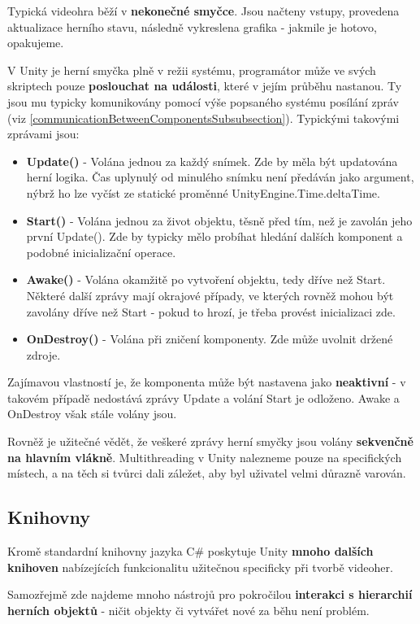 Typická videohra běží v \textbf{nekonečné smyčce}. Jsou načteny vstupy, provedena aktualizace herního stavu, následně vykreslena grafika - jakmile je hotovo, opakujeme. 

V Unity je herní smyčka plně v režii systému, programátor může ve svých skriptech pouze \textbf{poslouchat na události}, které v jejím průběhu nastanou. Ty jsou mu typicky komunikovány pomocí výše popsaného systému posílání zpráv (viz \ref{communicationBetweenComponentsSubsubsection}).
Typickými takovými zprávami jsou:

\begin{itemize}
    \item \textbf{Update()} - Volána jednou za každý snímek. Zde by měla být updatována herní logika. Čas uplynulý od minulého snímku není předáván jako argument, nýbrž ho lze vyčíst ze statické proměnné UnityEngine.Time.deltaTime.
    \item \textbf{Start()} - Volána jednou za život objektu, těsně před tím, než je zavolán jeho první Update(). Zde by typicky mělo probíhat hledání dalších komponent a podobné inicializační operace.
    \item \textbf{Awake()} - Volána okamžitě po vytvoření objektu, tedy dříve než Start. Některé další zprávy mají okrajové případy, ve kterých rovněž mohou být zavolány dříve než Start - pokud to hrozí, je třeba provést inicializaci zde.
    \item \textbf{OnDestroy()} - Volána při zničení komponenty. Zde může uvolnit držené zdroje.
\end{itemize}
Zajímavou vlastností je, že komponenta může být nastavena jako \textbf{neaktivní} - v takovém případě nedostává zprávy Update a volání Start je odloženo. Awake a OnDestroy však stále volány jsou.

Rovněž je užitečné vědět, že veškeré zprávy herní smyčky jsou volány \textbf{sekvenčně na hlavním vlákně}. Multithreading v Unity nalezneme pouze na specifických místech, a na těch si tvůrci dali záležet, aby byl uživatel velmi důrazně varován.


\subsection{Knihovny}

Kromě standardní knihovny jazyka C\# poskytuje Unity \textbf{mnoho dalších knihoven} nabízejících funkcionalitu užitečnou specificky při tvorbě videoher.

Samozřejmě zde najdeme mnoho nástrojů pro pokročilou \textbf{interakci s hierarchií herních objektů} - ničit objekty či vytvářet nové za běhu není problém. 

